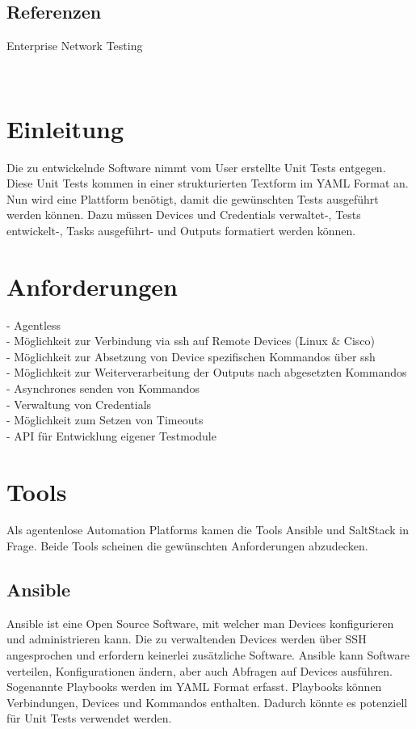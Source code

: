 \documentclass[a4,12pt]{scrartcl}
\begin{document}
\subsection{Referenzen}
\begin{description}
\item[Enterprise Network Testing] \hfill \\
 \newline
{}
\end{description}
\newpage
\section{Einleitung}
Die zu entwickelnde Software nimmt vom User erstellte Unit Tests entgegen. Diese Unit Tests kommen in einer strukturierten Textform im YAML Format an. Nun wird eine Plattform benötigt, damit die gewünschten Tests ausgeführt werden können. Dazu müssen Devices und Credentials verwaltet-, Tests entwickelt-, Tasks ausgeführt- und Outputs formatiert werden können. 
\newpage

\section{Anforderungen}

- Agentless \\
\noindent - Möglichkeit zur Verbindung via ssh auf Remote Devices (Linux \& Cisco)\\
\noindent - Möglichkeit zur Absetzung von Device spezifischen Kommandos über ssh \\
\noindent - Möglichkeit zur Weiterverarbeitung der Outputs nach abgesetzten Kommandos \\
\noindent - Asynchrones senden von Kommandos \\
\noindent - Verwaltung von Credentials \\
\noindent - Möglichkeit zum Setzen von Timeouts \\
\noindent - API für Entwicklung eigener Testmodule \\

\newpage
\section{Tools}
Als agentenlose Automation Platforms kamen die Tools Ansible und SaltStack in Frage. Beide Tools scheinen die gewünschten Anforderungen abzudecken. 
\subsection{Ansible}
Ansible ist eine Open Source Software, mit welcher man Devices konfigurieren und administrieren kann. Die zu verwaltenden Devices werden über SSH angesprochen und erfordern keinerlei zusätzliche Software. Ansible kann Software verteilen, Konfigurationen ändern, aber auch Abfragen auf Devices ausführen. Sogenannte Playbooks werden im YAML Format erfasst. Playbooks können Verbindungen, Devices und Kommandos enthalten. Dadurch könnte es potenziell für Unit Tests verwendet werden.
\end{document}
